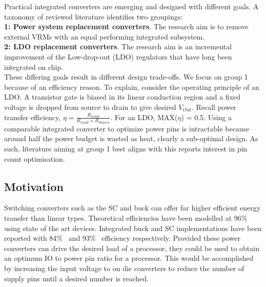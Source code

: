 \documentclass[letterpaper,twocolumn,10pt]{article}
\begin{document}
Practical integrated converters are emerging and designed with different goals. A taxonomy of reviewed literature identifies two groupings:\\
\textbf{1: Power system replacement converters}. The research aim is to remove external VRMs with an equal performing integrated subsystem.\\
\textbf{2: LDO replacement converters}. The research aim is an incremental improvement of the Low-drop-out (LDO) regulators that have long been integrated on chip.\\
These differing goals result in different design trade-offs. We focus on group 1 because of an efficiency reason. To explain, consider the operating principle of an LDO. A transistor gate is biased in its linear conduction region and a fixed voltage is dropped from source to drain to give desired $V_{Out}$. Recall power transfer efficiency, $\eta = \frac{R_{Load}}{R_{Load} + R_{Source}}$. For an LDO, MAX($\eta$) = 0.5. Using a comparable integrated converter to optimize power pins is intractable because around half the power budget is wasted as heat, clearly a sub-optimal design. As such, literature aiming at group 1 best aligns with this reports interest in pin count optimisation.\\  

\subsection{Motivation}
Switching converters such as the SC and buck can offer far higher efficient energy transfer than linear types. Theoretical efficiencies have been modelled at 96\%~\cite{Rodriguez2014} using state of the art devices. Integrated buck and SC implementations have been reported with 84\%~\cite{Cheng2013} and 93\%~\cite{Damak2013} efficiency respectively. Provided these power converters can drive the desired load of a processor, they could be used to obtain an optimum IO to power pin ratio for a processor. This would be accomplished by increasing the input voltage to on die converters to reduce the number of supply pins until a desired number is reached.  
\end{document}
